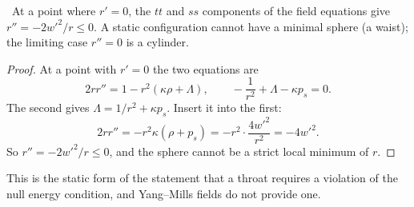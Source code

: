 \begin{theorem}\label{thm:nowaist}\ver\nogo\
At a point where $r'=0$, the $tt$ and $ss$ components of the field equations give $r''=-2w'^2/r\le0$. A static configuration cannot have a minimal sphere (a waist); the limiting case $r''=0$ is a cylinder.
\end{theorem}
\begin{proof}
At a point with $r'=0$ the two equations are
\[
2rr''=1-r^2(\kappa\rho+\Lambda),\qquad-\frac1{r^2}+\Lambda-\kappa p_s=0 .
\]
The second gives $\Lambda=1/r^2+\kappa p_s$. Insert it into the first:
\[
2rr''=-r^2\kappa(\rho+p_s)=-r^2\cdot\frac{4w'^2}{r^2}=-4w'^2 .
\]
So $r''=-2w'^2/r\le0$, and the sphere cannot be a strict local minimum of $r$.
\end{proof}


This is the static form of the statement that a throat requires a violation of the null energy condition, and Yang--Mills fields do not provide one.

